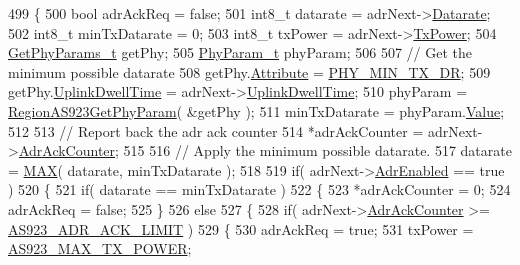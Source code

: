 \begin{DoxyCode}
499 \{
500     \textcolor{keywordtype}{bool} adrAckReq = \textcolor{keyword}{false};
501     int8\_t datarate = adrNext->\mbox{\hyperlink{structs_adr_next_params_ae2f6080f3aa0e9485c55513ca56bb24d}{Datarate}};
502     int8\_t minTxDatarate = 0;
503     int8\_t txPower = adrNext->\mbox{\hyperlink{structs_adr_next_params_a037b4f849fa8ed4aa1d3c58aef2b28ec}{TxPower}};
504     \mbox{\hyperlink{structs_get_phy_params}{GetPhyParams\_t}} getPhy;
505     \mbox{\hyperlink{unionu_phy_param}{PhyParam\_t}} phyParam;
506 
507     \textcolor{comment}{// Get the minimum possible datarate}
508     getPhy.\mbox{\hyperlink{structs_get_phy_params_abdcb168ffd6913b85e2f635d7a475f2d}{Attribute}} = \mbox{\hyperlink{group___r_e_g_i_o_n_gga51cbe8f5433d914fe9cf81b451de2c2daace3e56c88b40def8ed6a9106871e7de}{PHY\_MIN\_TX\_DR}};
509     getPhy.\mbox{\hyperlink{structs_get_phy_params_a0e6663762d6f9173bc8d8cb018f8f17a}{UplinkDwellTime}} = adrNext->\mbox{\hyperlink{structs_adr_next_params_a0e6663762d6f9173bc8d8cb018f8f17a}{UplinkDwellTime}};
510     phyParam = \mbox{\hyperlink{group___r_e_g_i_o_n_a_s923_ga20508dee35c0f25ff507478c5235fdeb}{RegionAS923GetPhyParam}}( &getPhy );
511     minTxDatarate = phyParam.\mbox{\hyperlink{unionu_phy_param_a8e0dcce3428a8051614e852b8836d0d1}{Value}};
512 
513     \textcolor{comment}{// Report back the adr ack counter}
514     *adrAckCounter = adrNext->\mbox{\hyperlink{structs_adr_next_params_a24f0356a3491bf07be9ac99ffa33896a}{AdrAckCounter}};
515 
516     \textcolor{comment}{// Apply the minimum possible datarate.}
517     datarate = \mbox{\hyperlink{utilities_8h_afa99ec4acc4ecb2dc3c2d05da15d0e3f}{MAX}}( datarate, minTxDatarate );
518 
519     \textcolor{keywordflow}{if}( adrNext->\mbox{\hyperlink{structs_adr_next_params_ab3e2fb44577c95786e11aacd56769703}{AdrEnabled}} == \textcolor{keyword}{true} )
520     \{
521         \textcolor{keywordflow}{if}( datarate == minTxDatarate )
522         \{
523             *adrAckCounter = 0;
524             adrAckReq = \textcolor{keyword}{false};
525         \}
526         \textcolor{keywordflow}{else}
527         \{
528             \textcolor{keywordflow}{if}( adrNext->\mbox{\hyperlink{structs_adr_next_params_a24f0356a3491bf07be9ac99ffa33896a}{AdrAckCounter}} >= \mbox{\hyperlink{group___r_e_g_i_o_n_a_s923_ga83b8b9ab4bab852209f471da8518bf2d}{AS923\_ADR\_ACK\_LIMIT}} )
529             \{
530                 adrAckReq = \textcolor{keyword}{true};
531                 txPower = \mbox{\hyperlink{group___r_e_g_i_o_n_a_s923_ga572944e6a8933722a954e4cee98fa0ee}{AS923\_MAX\_TX\_POWER}};

\end{DoxyCode}
